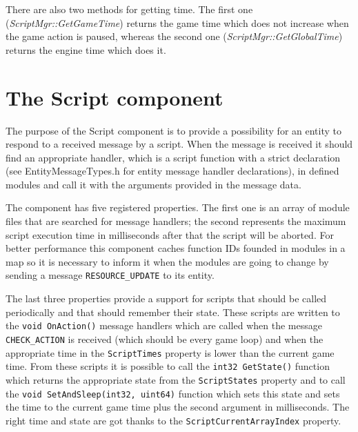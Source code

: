 \documentclass[a4paper, 12pt]{report}
\begin{document}
There are also two methods for getting time. The first one (\emph{ScriptMgr::GetGameTime}) returns the game time which does not increase when the game action is paused, whereas the second one (\emph{ScriptMgr::\-Get\-Global\-Time}) returns the engine time which does it.

\section{The Script component}
\label{sec:script-component}

The purpose of the Script component is to provide a possibility for an entity to respond to a received message by a script. When the message is received it should find an appropriate handler, which is a script function with a strict declaration (see EntityMessageTypes.h for entity message handler declarations), in defined modules and call it with the arguments provided in the message data.

The component has five registered properties. The first one is an array of module files that are searched for message handlers; the second represents the maximum script execution time in milliseconds after that the script will be aborted. For better performance this component caches function IDs founded in modules in a map so it is necessary to inform it when the modules are going to change by sending a message \verb/RESOURCE_UPDATE/ to its entity.

The last three properties provide a support for scripts that should be called periodically and that should remember their state. These scripts are written to the \verb/void OnAction()/ message handlers which are called when the message \verb/CHECK_ACTION/ is received (which should be every game loop) and when the appropriate time in the \verb/ScriptTimes/ property is lower than the current game time. From these scripts it is possible to call the \verb/int32 GetState()/ function which returns the appropriate state from the \verb/ScriptStates/ property and to call the \verb/void SetAndSleep(int32, uint64)/ function which sets this state and sets the time to the current game time plus the second argument in milliseconds. The right time and state are got thanks to the \verb/ScriptCurrentArrayIndex/ property.
\end{document}
